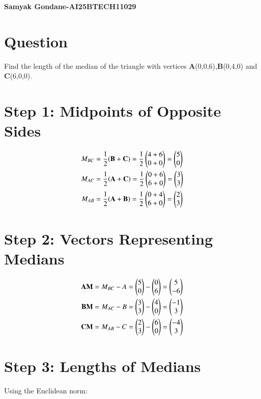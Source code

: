 \documentclass{article}
\begin{document}
\begin{center}
\large
    \textbf{Samyak Gondane-AI25BTECH11029}
\end{center}
\date{}


\section*{Question}
Find the length of the median of the triangle with vertices \textbf{A}(0,0,6),\textbf{B}(0,4,0) and \textbf{C}(6,0,0).


\section*{Step 1: Midpoints of Opposite Sides}
\begin{align}
M_{BC} &= \frac{1}{2}(\mathbf{B} + \mathbf{C}) = \frac{1}{2} \begin{pmatrix}4 + 6 \\ 0 + 0\end{pmatrix} = \begin{pmatrix}5 \\ 0\end{pmatrix} \\
M_{AC} &= \frac{1}{2}(\mathbf{A} + \mathbf{C}) = \frac{1}{2} \begin{pmatrix}0 + 6 \\ 6 + 0\end{pmatrix} = \begin{pmatrix}3 \\ 3\end{pmatrix} \\
M_{AB} &= \frac{1}{2}(\mathbf{A} + \mathbf{B}) = \frac{1}{2} \begin{pmatrix}0 + 4 \\ 6 + 0\end{pmatrix} = \begin{pmatrix}2 \\ 3\end{pmatrix}
\end{align}

\section*{Step 2: Vectors Representing Medians}
\begin{align}
\mathbf{AM} &= M_{BC} - A = \begin{pmatrix}5 \\ 0\end{pmatrix} - \begin{pmatrix}0 \\ 6\end{pmatrix} = \begin{pmatrix}5 \\ -6\end{pmatrix} \\
\mathbf{BM} &= M_{AC} - B = \begin{pmatrix}3 \\ 3\end{pmatrix} - \begin{pmatrix}4 \\ 0\end{pmatrix} = \begin{pmatrix}-1 \\ 3\end{pmatrix} \\
\mathbf{CM} &= M_{AB} - C = \begin{pmatrix}2 \\ 3\end{pmatrix} - \begin{pmatrix}6 \\ 0\end{pmatrix} = \begin{pmatrix}-4 \\ 3\end{pmatrix}
\end{align}

\section*{Step 3: Lengths of Medians}
Using the Euclidean norm:
\end{document}
